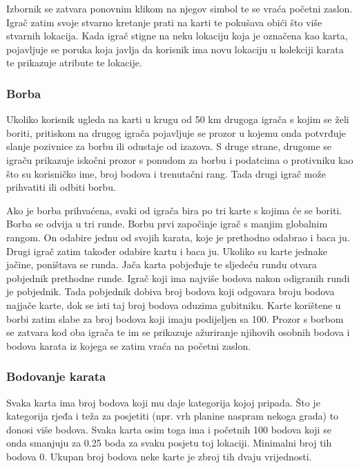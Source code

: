 		{Izbornik se zatvara ponovnim klikom na njegov simbol te se vraća početni zaslon. Igrač zatim svoje stvarno kretanje prati na karti te pokušava obići što više stvarnih lokacija. Kada igrač stigne na neku lokaciju koja je označena kao karta, pojavljuje se poruka koja javlja da korisnik ima novu lokaciju u kolekciji karata te prikazuje atribute te lokacije.}\newpage
		
		\subsubsection{Borba}
		
		Ukoliko korisnik ugleda na karti u krugu od 50 km drugoga igrača s kojim se želi boriti, pritiskom na drugog igrača pojavljuje se prozor u kojemu onda potvrđuje slanje pozivnice za borbu ili odustaje od izazova. S druge strane, drugome se  igraču prikazuje iskočni prozor s ponudom za borbu i podatcima o protivniku kao što su korisničko ime, broj bodova i trenutačni rang. Tada drugi igrač može prihvatiti ili odbiti borbu.
			 
		Ako je borba prihvaćena, svaki od igrača bira po tri karte s kojima će se boriti. Borba se odvija u tri runde. Borbu prvi započinje igrač s manjim globalnim rangom. On odabire jednu od svojih karata, koje je prethodno odabrao i baca ju. Drugi igrač zatim također odabire kartu i baca ju. Ukoliko su karte jednake jačine, poništava se runda. Jača karta pobjeđuje te sljedeću rundu otvara pobjednik prethodne runde. Igrač koji ima najviše bodova nakon odigranih rundi je pobjednik. Tada pobjednik dobiva broj bodova koji odgovara broju bodova najjače karte, dok se isti taj broj bodova oduzima gubitniku. Karte korištene u borbi zatim slabe za broj bodova koji imaju podijeljen sa 100. Prozor s borbom se zatvara kod oba igrača te im se prikazuje ažuriranje njihovih osobnih bodova i bodova karata iz kojega se zatim vraća na početni zaslon.
		
		\subsubsection{Bodovanje karata}
		
		{Svaka karta ima broj bodova koji mu daje kategorija kojoj pripada. Što je kategorija rjeđa i teža za posjetiti (npr. vrh planine naspram nekoga grada) to donosi više bodova. Svaka karta osim toga ima i početnih 100 bodova koji se onda smanjuju za 0.25 boda za svaku posjetu toj lokaciji. Minimalni broj tih bodova 0. Ukupan broj bodova neke karte je zbroj tih dvaju vrijednosti.\\ }
		
